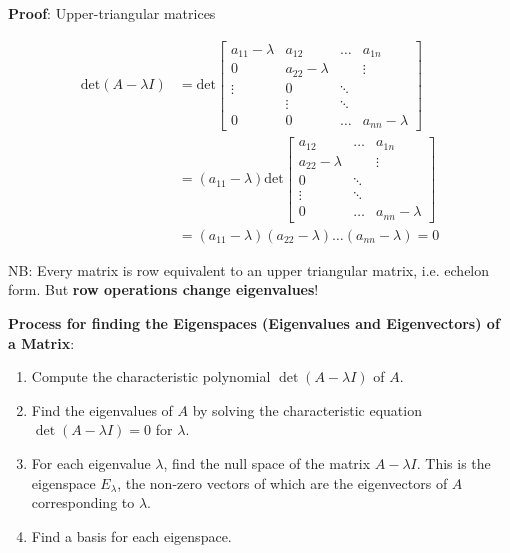 \begin{paracol}{2}
\switchcolumn


\textbf{Proof}: Upper-triangular matrices

\vspace{-20pt}

\begin{align*}
    \text{det}(A - \lambda I) & = \text{det} \begin{bmatrix}
    a_{11} - \lambda & a_{12} & \dots & a_{1n} \\
    0 & a_{22} - \lambda & & \vdots \\
    \vdots & 0 & \ddots & \\
     & \vdots & \ddots & \\
     0 & 0 & \dots & a_{nn} - \lambda
\end{bmatrix} \\
    & = (a_{11} - \lambda) \text{det} \begin{bmatrix}
    a_{12} & \dots & a_{1n} \\
    a_{22} - \lambda & & \vdots \\
    0 & \ddots & \\
    \vdots & \ddots & \\
    0 & \dots & a_{nn} - \lambda
\end{bmatrix} \\
    & = (a_{11} - \lambda) (a_{22} - \lambda) \dots (a_{nn} - \lambda) = 0
\end{align*}

NB: Every matrix is row equivalent to an upper triangular matrix, i.e. echelon form. But \textbf{row operations change eigenvalues}!

\end{paracol}

\textbf{Process for finding the Eigenspaces (Eigenvalues and Eigenvectors) of a Matrix}:

\begin{enumerate}
    \item Compute the characteristic polynomial $\det(A - \lambda I)$ of $A$.
    \item Find the eigenvalues of $A$ by solving the characteristic equation $\det(A - \lambda I) = 0$ for $\lambda$.
    \item For each eigenvalue $\lambda$, find the null space of the matrix $A - \lambda I$. This is the eigenspace $E_\lambda$, the non-zero vectors of which are the eigenvectors of $A$ corresponding to $\lambda$.
    \item Find a basis for each eigenspace.
\end{enumerate}

